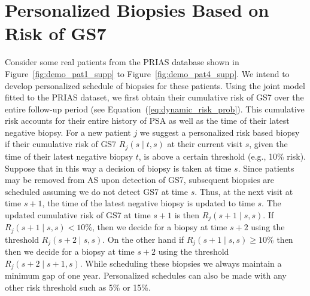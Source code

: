 \section{Personalized Biopsies Based on Risk of GS7}
Consider some real patients from the PRIAS database shown in Figure~\ref{fig:demo_pat1_supp} to Figure~\ref{fig:demo_pat4_supp}. We intend to develop personalized schedule of biopsies for these patients. Using the joint model fitted to the PRIAS dataset, we first obtain their cumulative risk of GS7 over the entire follow-up period (see Equation~(\ref{eq:dynamic_risk_prob}). This cumulative risk accounts for their entire history of PSA as well as the time of their latest negative biopsy. For a new patient $j$ we suggest a personalized risk based biopsy if their cumulative risk of GS7 $R_j(s \mid t, s)$  at their current visit $s$, given the time of their latest negative biopsy $t$, is above a certain threshold (e.g., 10\% risk). Suppose that in this way a decision of biopsy is taken at time $s$. Since patients may be removed from AS upon detection of GS7, subsequent biopsies are scheduled assuming we do not detect GS7 at time $s$. Thus, at the next visit at time $s + 1$, the time of the latest negative biopsy is updated to time $s$. The updated cumulative risk of GS7 at time $s + 1$ is then $R_j(s + 1 \mid s, s)$. If $R_j(s + 1 \mid s, s) < 10\%$, then we decide for a biopsy at time $s + 2$ using the threshold $R_j(s + 2 \mid s,s)$. On the other hand if $R_j(s + 1 \mid s, s) \geq 10\%$ then then we decide for a biopsy at time $s + 2$ using the threshold $R_j(s + 2 \mid s + 1, s)$. While scheduling these biopsies we always maintain a minimum gap of one year. Personalized schedules can also be made with any other risk threshold such as 5\% or 15\%.

